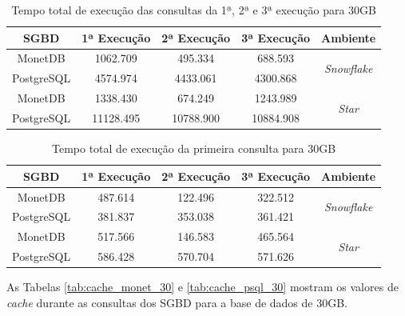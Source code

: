 \begin{table}[htpb]
        \centering
        \caption{Tempo total de execução das consultas da 1ª, 2ª e 3ª execução para 30GB}
        \label{tab:queries_cache_30}
        \begin{tabular}{|c|c|c|c|c|}
        \hline
        SGBD       & 1ª Execução & 2ª Execução & 3ª Execução & Ambiente                            \\ \hline
        MonetDB    & 1062.709    & 495.334     & 688.593     & \multirow{2}{*}{\textit{Snowflake}} \\ \cline{1-4}
        PostgreSQL & 4574.974    & 4433.061    & 4300.868    &                                     \\ \hline
        MonetDB    & 1338.430    & 674.249     & 1243.989    & \multirow{2}{*}{\textit{Star}}      \\ \cline{1-4}
        PostgreSQL & 11128.495   & 10788.900   & 10884.908   &                                     \\ \hline
        \end{tabular}
\end{table}

\begin{table}[htpb]
        \centering
        \caption{Tempo total de execução da primeira consulta para 30GB}
        \label{tab:q1_cache_30}
        \begin{tabular}{|c|c|c|c|c|}
        \hline
        SGBD       & 1ª Execução & 2ª Execução & 3ª Execução & Ambiente                            \\ \hline
        MonetDB    & 487.614     & 122.496     & 322.512     & \multirow{2}{*}{\textit{Snowflake}} \\ \cline{1-4}
        PostgreSQL & 381.837     & 353.038     & 361.421     &                                     \\ \hline
        MonetDB    & 517.566     & 146.583     & 465.564     & \multirow{2}{*}{\textit{Star}}      \\ \cline{1-4}
        PostgreSQL & 586.428     & 570.704     & 571.626     &                                     \\ \hline
        \end{tabular}
\end{table}

As Tabelas \ref{tab:cache_monet_30} e \ref{tab:cache_psql_30} mostram os valores de \textit{cache} durante as consultas dos SGBD para a base de dados de 30GB.

